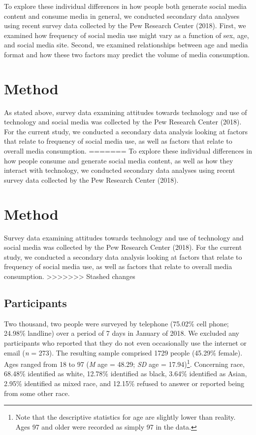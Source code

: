 \documentclass[man, fleqn, noextraspace]{apa6}
\let\rmarkdownfootnote\footnote%
\def\footnote{\protect\rmarkdownfootnote}
\theoremstyle{definition}
\theoremstyle{definition}
\theoremstyle{definition}
\theoremstyle{remark}
\begin{document}
To explore these individual differences in how people both generate
social media content and consume media in general, we conducted
secondary data analyses using recent survey data collected by the Pew
Research Center (2018). First, we examined how frequency of social media
use might vary as a function of sex, age, and social media site. Second,
we examined relationships between age and media format and how these two
factors may predict the volume of media consumption.

\section{Method}\label{method}

As stated above, survey data examining attitudes towards technology and
use of technology and social media was collected by the Pew Research
Center (2018). For the current study, we conducted a secondary data
analysis looking at factors that relate to frequency of social media
use, as well as factors that relate to overall media consumption.
=======
To explore these individual differences in how people consume and
generate social media content, as well as how they interact with
technology, we conducted secondary data analyses using recent survey
data collected by the Pew Research Center (2018).

\section{Method}\label{method}

Survey data examining attitudes towards technology and use of technology
and social media was collected by the Pew Research Center (2018). For
the current study, we conducted a secondary data analysis looking at
factors that relate to frequency of social media use, as well as factors
that relate to overall media consumption.
>>>>>>> Stashed changes

\subsection{Participants}\label{participants}

Two thousand, two people were surveyed by telephone (75.02\% cell phone;
24.98\% landline) over a period of 7 days in January of 2018. We
excluded any participants who reported that they do not even
occasionally use the internet or email (\emph{n} = 273). The resulting
sample comprised 1729 people (45.29\% female). Ages ranged from 18 to 97
(\emph{M} age = 48.29; \emph{SD} age =
17.94)\footnote{Note that the descriptive statistics for age are slightly lower than reality. Ages 97 and older were recorded as simply 97 in the data.}.
Concerning race, 68.48\% identified as white, 12.78\% identified as
black, 3.64\% identified as Asian, 2.95\% identified as mixed race, and
12.15\% refused to answer or reported being from some other race.
\end{document}
